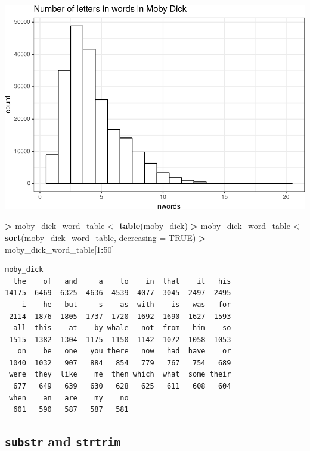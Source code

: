 \documentclass[]{krantz}
\makeatletter
\newenvironment{Shaded}{\begin{snugshade}}{\end{snugshade}}
\newcommand{\DataTypeTok}[1]{\textcolor[rgb]{0.27,0.27,0.27}{#1}}
\newcommand{\DecValTok}[1]{\textcolor[rgb]{0.06,0.06,0.06}{#1}}
\newcommand{\KeywordTok}[1]{\textcolor[rgb]{0.27,0.27,0.27}{\textbf{#1}}}
\newcommand{\NormalTok}[1]{#1}
\newcommand{\OperatorTok}[1]{\textcolor[rgb]{0.43,0.43,0.43}{\textbf{#1}}}
\newcommand{\OtherTok}[1]{\textcolor[rgb]{0.37,0.37,0.37}{#1}}
\newcommand{\StringTok}[1]{\textcolor[rgb]{0.5,0.5,0.5}{#1}}
\newenvironment{kframe}{%
\medskip{}
\setlength{\fboxsep}{.8em}
 \def\at@end@of@kframe{}%
 \ifinner\ifhmode%
  \def\at@end@of@kframe{\end{minipage}}%
  \begin{minipage}{\columnwidth}%
 \fi\fi%
 \def\FrameCommand##1{\hskip\@totalleftmargin \hskip-\fboxsep
 \colorbox{shadecolor}{##1}\hskip-\fboxsep
     \hskip-\linewidth \hskip-\@totalleftmargin \hskip\columnwidth}%
 \MakeFramed {\advance\hsize-\width
   \@totalleftmargin\z@ \linewidth\hsize
   \@setminipage}}%
 {\par\unskip\endMakeFramed%
 \at@end@of@kframe}
\renewenvironment{Shaded}{\begin{kframe}}{\end{kframe}}
\makeatother
\begin{document}
\includegraphics{bookdown_files/figure-latex/unnamed-chunk-266-1.pdf}

\begin{Shaded}
\begin{Highlighting}[]
\OperatorTok{>}\StringTok{ }\NormalTok{moby_dick_word_table <-}\StringTok{ }\KeywordTok{table}\NormalTok{(moby_dick)}
\OperatorTok{>}\StringTok{ }\NormalTok{moby_dick_word_table <-}\StringTok{ }\KeywordTok{sort}\NormalTok{(moby_dick_word_table, }\DataTypeTok{decreasing =} \OtherTok{TRUE}\NormalTok{)}
\OperatorTok{>}\StringTok{ }\NormalTok{moby_dick_word_table[}\DecValTok{1}\OperatorTok{:}\DecValTok{50}\NormalTok{]}
\end{Highlighting}
\end{Shaded}

\begin{verbatim}
moby_dick
  the    of   and     a    to    in  that    it   his 
14175  6469  6325  4636  4539  4077  3045  2497  2495 
    i    he   but     s    as  with    is   was   for 
 2114  1876  1805  1737  1720  1692  1690  1627  1593 
  all  this    at    by whale   not  from   him    so 
 1515  1382  1304  1175  1150  1142  1072  1058  1053 
   on    be   one   you there   now   had  have    or 
 1040  1032   907   884   854   779   767   754   689 
 were  they  like    me  then which  what  some their 
  677   649   639   630   628   625   611   608   604 
 when    an   are    my    no 
  601   590   587   587   581 
\end{verbatim}

\hypertarget{substr-and-strtrim}{%
\subsection{\texorpdfstring{\texttt{substr} and \texttt{strtrim}}{substr and strtrim}}\label{substr-and-strtrim}}
\end{document}
